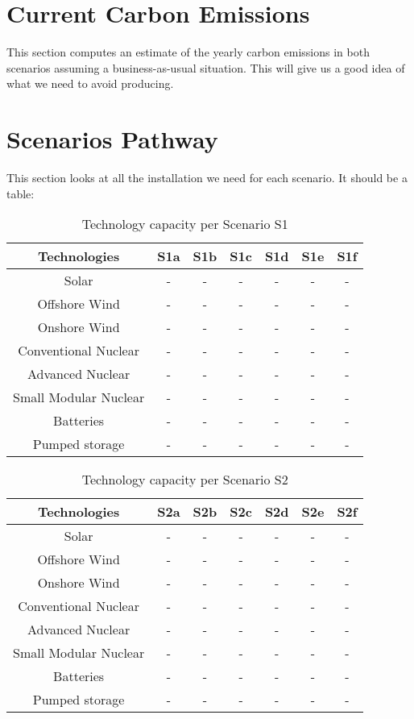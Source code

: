\section{Current Carbon Emissions}

This section computes an estimate of the yearly carbon emissions in both scenarios assuming a business-as-usual situation. This will give us a good idea of what we need to avoid producing.


\section{Scenarios Pathway}

This section looks at all the installation we need for each scenario. It should be a table:



\begin{table}[ht]
\caption[Technology capacity per Scenario S1]{Technology capacity per Scenario S1}
\begin{tabular}{ c c c c c c c }
	\toprule
	Technologies & S1a & S1b & S1c & S1d & S1e & S1f \\
	\midrule
	Solar & - & - & - & - & - & - \\
	Offshore Wind & - & - & - & - & - & - \\
	Onshore Wind & - & - & - & - & - & - \\
	Conventional Nuclear & - & - & - & - & - & - \\
	Advanced Nuclear & - & - & - & - & - & - \\
	Small Modular Nuclear & - & - & - & - & - & - \\
	Batteries & - & - & - & - & - & - \\
	Pumped storage & - & - & - & - & - & - \\
	\bottomrule
\end{tabular}
\end{table}


\begin{table}[ht]
\caption[Technology capacity per Scenario S2]{Technology capacity per Scenario S2}
\begin{tabular}{ c c c c c c c }
	\toprule
	Technologies & S2a & S2b & S2c & S2d & S2e & S2f \\
	\midrule
	Solar & - & - & - & - & - & - \\
	Offshore Wind & - & - & - & - & - & - \\
	Onshore Wind & - & - & - & - & - & - \\
	Conventional Nuclear & - & - & - & - & - & - \\
	Advanced Nuclear & - & - & - & - & - & - \\
	Small Modular Nuclear & - & - & - & - & - & - \\
	Batteries & - & - & - & - & - & - \\
	Pumped storage & - & - & - & - & - & - \\
	\bottomrule
\end{tabular}
\end{table}


